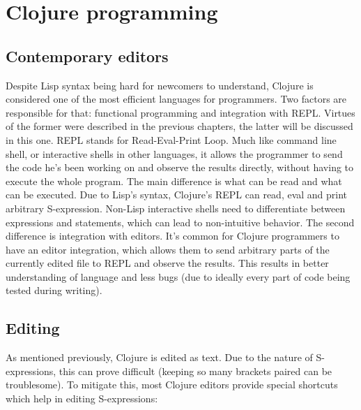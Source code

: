 \documentclass[11pt]{scrartcl}
\begin{document}
\section{Clojure programming}
\subsection{Contemporary editors}
Despite Lisp syntax being hard for newcomers to understand, Clojure is
considered one of the most efficient languages for programmers.
Two factors are responsible for that: functional programming and integration
with REPL.
Virtues of the former were described in the previous chapters, the latter will
be discussed in this one.
REPL stands for Read-Eval-Print Loop.
Much like command line shell, or interactive shells in other languages, it
allows the programmer to send the code he’s been working on and observe the
results directly, without having to execute the whole program.
The main difference is what can be read and what can be executed.
Due to Lisp’s syntax, Clojure’s REPL can read, eval and print arbitrary
S-expression.
Non-Lisp interactive shells need to differentiate between expressions and
statements, which can lead to non-intuitive behavior.
The second difference is integration with editors.
It’s common for Clojure programmers to have an editor integration, which allows
them to send arbitrary parts of the currently edited file to REPL and observe
the results.
This results in better understanding of language and less bugs (due to ideally
every part of code being tested during writing).


\subsection{Editing}
As mentioned previously, Clojure is edited as text.
Due to the nature of S-expressions, this can prove difficult (keeping so many
brackets paired can be troublesome).
To mitigate this, most Clojure editors provide special shortcuts which help in
editing S-expressions:
\end{document}
